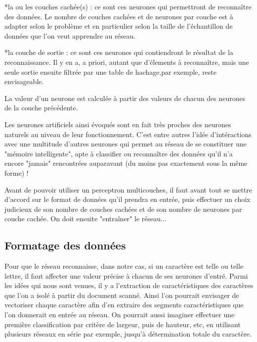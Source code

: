 \documentclass[a4paper,10pt]{report}
\begin{document}
*la ou les couches cach\'ee(s) : ce sont ces neurones qui permettront de
reconna\^itre des donn\'ees. Le nombre de couches cach\'ees et de
neurones par couche est \`a adapter selon le probl\`eme et en
particulier selon la taille de l'\'echantillon de donn\'ees que l'on veut
apprendre au r\'eseau.

*la couche de sortie : ce sont ces neurones qui contiendront le
r\'esultat de la reconnaissance. Il y en a, a priori, autant que
d'\'elements \`a reconna\^itre, mais une seule sortie ensuite filtr\'ee
par une table de hachage,par exemple, reste envisageable.


La valeur d'un neurone est calcul\'ee \`a partir des valeurs de chacun
des neurones de la couche pr\'ec\'edente.

Les neurones artificiels ainsi \'evoqu\'es sont en fait tr\`es proches
des neurones naturels au niveau de leur fonctionnement. C'est entre
autres l'id\'ee d'int\'eractions avec une multitude d'autres neurones
qui permet au r\'eseau de se constituer une "m\'emoire intelligente",
apte \`a classifier ou reconnaĩtre des donn\'ees qu'il n'a encore
"jamais" rencontr\'ees auparavant (du moins pas exactement sous la
même forme) !

Avant de pouvoir utiliser un perceptron multicouches, il faut avant tout se mettre d'accord sur le
format de donn\'ees qu'il prendra en entr\'ee, puis effectuer un choix
judicieux de son nombre de couches cach\'ees et de son nombre de neurones
par couche cach\'ee. On doit ensuite "entra\^iner" le r\'eseau...


\subsection{Formatage des donn\'ees} %
\label{sec:formatage_des_donnees}

Pour que le r\'eseau reconnaisse, dans notre cas, si un caract\`ere est
telle ou telle lettre, il faut affecter une valeur pr\'ecise à chacun de
ses neurones d'entr\'e.
Parmi les id\'ees qui nous sont venues, il y a l'extraction de
caract\'eristiques des caract\`eres que l'on a isol\'e \`a partir du document
scann\'e. Ainsi l'on pourrait envisager de vectoriser chaque caract\`ere
afin d'en extraire des segments caract\'eristiques que l'on donnerait en
entr\'ee au r\'eseau. On pourrait aussi imaginer effectuer une premi\`ere
classification par crit\`ere de largeur, puis de hauteur, etc, en utilisant
plusieurs r\'eseaux en s\'erie par exemple, jusqu'\`a d\'etermination totale du
caract\`ere.
\end{document}
